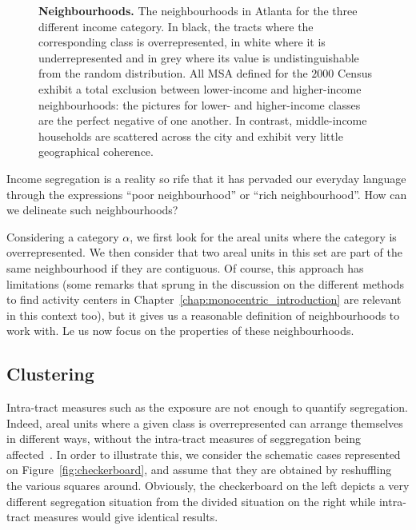 \begin{figure}
    \caption{{\bf Neighbourhoods.} The neighbourhoods in Atlanta for the three different
      income category. In black, the tracts where the corresponding
      class is overrepresented, in white where it is
      underrepresented and in grey where its value is
      undistinguishable from the random distribution. All
      MSA defined for the $2000$ Census exhibit a total exclusion between
      lower-income and higher-income
      neighbourhoods: the pictures for lower- and higher-income classes are the
      perfect negative of one another. In contrast, middle-income households
      are scattered across the city and exhibit very little geographical coherence.}
\label{fig:atlanta_neighbourhoods}
\end{figure}

Income segregation is a reality so rife that it has pervaded our everyday
language through the expressions ``poor neighbourhood'' or ``rich
neighbourhood''. How can we delineate such neighbourhoods?

Considering a category $\alpha$,  we first look for the areal units where the
category is overrepresented. We then consider that two areal units in this set
are part of the same neighbourhood if they are contiguous. Of course, this
approach has limitations (some remarks that sprung in the discussion on the different methods to find
activity centers in Chapter~\ref{chap:monocentric_introduction} are relevant in
this context too), but it gives us a reasonable definition of neighbourhoods to
work with.
Le us now focus on the properties of these neighbourhoods.

\subsection{Clustering}
\label{sub:clustering}

Intra-tract measures such as the exposure are not enough to quantify
segregation. Indeed, areal units where a given class is overrepresented can
arrange themselves in different ways, without the intra-tract measures of
seggregation being affected~\cite{White:1983}. In order to illustrate this, we
consider the schematic cases represented on Figure~\ref{fig:checkerboard}, and
assume that  they are obtained by reshuffling the various squares around.
Obviously, the checkerboard on the left depicts a very different segregation
situation from the divided situation on the right while intra-tract measures
would give identical results.\\

